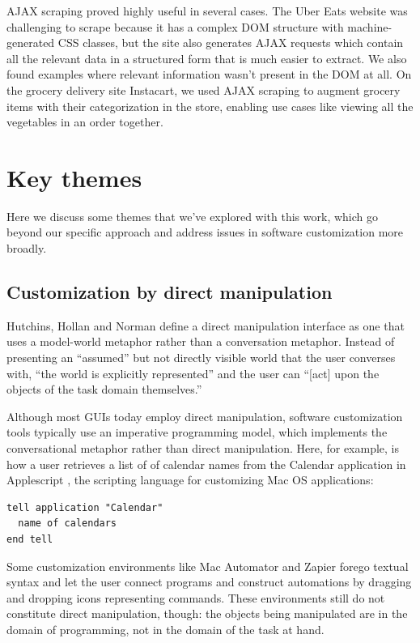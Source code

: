 \documentclass[sigplan,screen,10pt,anonymous,review]{acmart}
\begin{document}
AJAX scraping proved highly useful in several cases. The Uber Eats
website was challenging to scrape because it has a complex DOM structure
with machine-generated CSS classes, but the site also generates AJAX
requests which contain all the relevant data in a structured form that
is much easier to extract. We also found examples where relevant
information wasn't present in the DOM at all. On the grocery delivery
site Instacart, we used AJAX scraping to augment grocery items with
their categorization in the store, enabling use cases like viewing all
the vegetables in an order together.

\hypertarget{sec:themes}{%
\section{Key themes}\label{sec:themes}}

Here we discuss some themes that we've explored with this work, which go
beyond our specific approach and address issues in software
customization more broadly.

\hypertarget{sec:dm}{%
\subsection{Customization by direct manipulation}\label{sec:dm}}

Hutchins, Hollan and Norman \citep{hutchins1985} define a direct
manipulation interface as one that uses a model-world metaphor rather
than a conversation metaphor. Instead of presenting an ``assumed'' but
not directly visible world that the user converses with, ``the world is
explicitly represented'' and the user can ``{[}act{]} upon the objects
of the task domain themselves.''

Although most GUIs today employ direct manipulation, software
customization tools typically use an imperative programming model, which
implements the conversational metaphor rather than direct manipulation.
Here, for example, is how a user retrieves a list of of calendar names
from the Calendar application in Applescript \citep{cook2007}, the
scripting language for customizing Mac OS applications:

\begin{verbatim}
tell application "Calendar"
  name of calendars
end tell
\end{verbatim}

Some customization environments like Mac Automator and Zapier forego
textual syntax and let the user connect programs and construct
automations by dragging and dropping icons representing commands. These
environments still do not constitute direct manipulation, though: the
objects being manipulated are in the domain of programming, not in the
domain of the task at hand.
\end{document}
